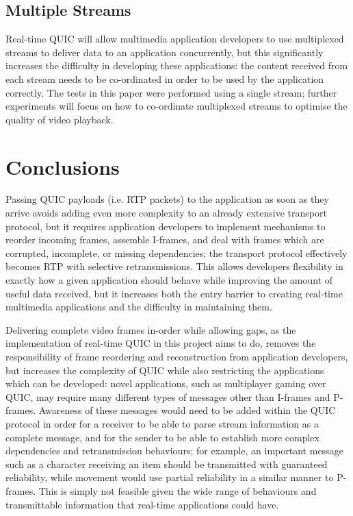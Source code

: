 \documentclass{mpaper}
\begin{document}
\subsection{Multiple Streams}
Real-time QUIC will allow multimedia application developers to use multiplexed streams to deliver data to an application concurrently, but this significantly increases the difficulty in developing these applications: the content received from each stream needs to be co-ordinated in order to be used by the application correctly. The tests in this paper were performed using a single stream; further experiments will focus on how to co-ordinate multiplexed streams to optimise the quality of video playback.

\section{Conclusions}

Passing QUIC payloads (i.e. RTP packets) to the application as soon as they arrive avoids adding even more complexity to an already extensive transport protocol, but it requires application developers to implement mechanisms to reorder incoming frames, assemble I-frames, and deal with frames which are corrupted, incomplete, or missing dependencies; the transport protocol effectively becomes RTP with selective retransmissions. This allows developers flexibility in exactly how a given application should behave while improving the amount of useful data received, but it increases both the entry barrier to creating real-time multimedia applications and the difficulty in maintaining them.

Delivering complete video frames in-order while allowing gaps, as the implementation of real-time QUIC in this project aims to do, removes the responsibility of frame reordering and reconstruction from application developers, but increases the complexity of QUIC while also restricting the applications which can be developed: novel applications, such as multiplayer gaming over QUIC, may require many different types of messages other than I-frames and P-frames. Awareness of these messages would need to be added within the QUIC protocol in order for a receiver to be able to parse stream information as a complete message, and for the sender to be able to establish more complex dependencies and retransmission behaviours; for example, an important message such as a character receiving an item should be transmitted with guaranteed reliability, while movement would use partial reliability in a similar manner to P-frames. This is simply not feasible given the wide range of behaviours and transmittable information that real-time applications could have.
\end{document}
